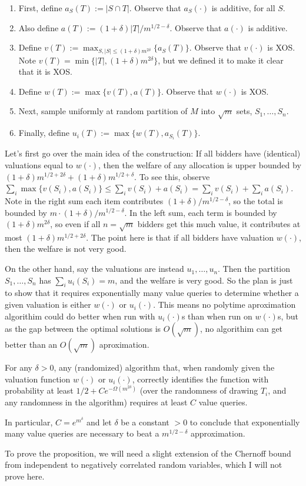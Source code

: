 \begin{enumerate}
\item First, define $a_S(T) := |S \cap T|$. Observe that $a_S(\cdot)$ is additive, for all $S$.
\item Also define $a(T) := (1+\delta)|T|/m^{1/2-\delta}$. Observe that $a(\cdot)$ is additive.
\item Define $v(T):= \max_{S, |S| \leq (1+\delta)m^{2\delta}}\{a_S(T)\}$. Observe that $v(\cdot)$ is XOS. Note $v(T) = \min\{|T|, (1+\delta)m^{2\delta}\}$, but we defined it to make it clear that it is XOS.
\item Define $w(T):= \max\{v(T), a(T)\}$. Observe that $w(\cdot)$ is XOS.
\item Next, sample uniformly at random partition of $M$ into $\sqrt{m}$ sets, $S_1,\ldots, S_n$.
\item Finally, define $u_i(T):= \max\{w(T),a_{S_i}(T)\}$.
\end{enumerate}

Let's first go over the main idea of the construction: If all bidders have (identical) valuations equal to $w(\cdot)$, then the welfare of any allocation is upper bounded by $(1+\delta)m^{1/2+2\delta} + (1+\delta)m^{1/2+\delta}$. To see this, observe $\sum_{i} \max\{v(S_i), a(S_i)\} \leq \sum_{i} v(S_i) + a(S_i) = \sum_{i} v(S_i) + \sum_i a(S_i)$. Note in the right sum each item contributes $ (1+\delta)/m^{1/2-\delta}$, so the total is bounded by $m\cdot (1+\delta)/m^{1/2-\delta}$. In the left sum, each term is bounded by $(1+\delta)m^{2\delta}$, so even if all $n = \sqrt{m}$ bidders get this much value, it contributes at most $(1+\delta)m^{1/2+2\delta}$. The point here is that if all bidders have valuation $w(\cdot)$, then the welfare is not very good.

On the other hand, say the valuations are instead $u_1,\ldots, u_n$. Then the partition $S_1,\ldots, S_n$ has $\sum_i u_i(S_i) = m$, and the welfare is very good. So the plan is just to show that it requires exponentially many value queries to determine whether a given valuation is either $w(\cdot)$ or $u_i(\cdot)$. This means no polytime aproximation algorithim could do better when run with $u_i(\cdot)$s than when run on $w(\cdot)$s, but as the gap between the optimal solutions is $O(\sqrt m)$, no algorithim can get better than an $O(\sqrt m)$ aproximation.

\begin{proposition} For any $\delta > 0$, any (randomized) algorithm that, when randomly given the valuation function $w(\cdot)$ or $u_i(\cdot)$, correctly identifies the function with probability at least $1/2 + Ce^{-\Omega(m^{2\delta})}$ (over the randomness of drawing $T_i$, and any randomness in the algorithm) requires at least $C$ value queries.

In particular, $C = e^{m^\delta}$ and let $\delta$ be a constant $> 0$ to conclude that exponentially many value queries are necessary to beat a $m^{1/2-\delta}$ approximation.
\end{proposition}
To prove the proposition, we will need a slight extension of the Chernoff bound from independent to negatively correlated random variables, which I will not prove here.

